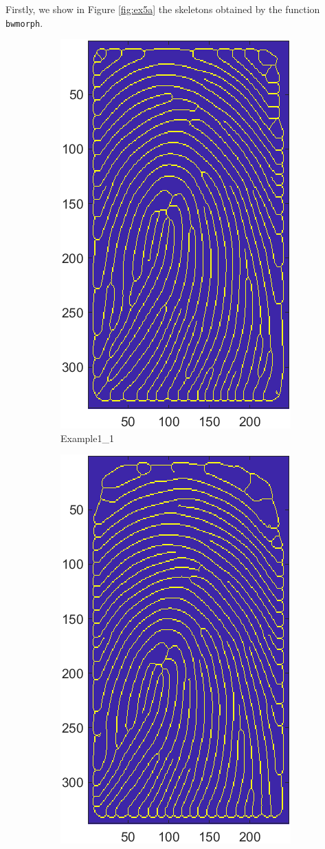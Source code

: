 \documentclass[a4paper]{article}
\def\inline{\lstinline[basicstyle=\ttfamily,keywordstyle={}]}
\begin{document}
Firstly, we show in Figure \ref{fig:ex5a} the skeletons obtained by the function \inline{bwmorph}.

\begin{figure}[H]
  \centering
       \begin{subfigure}[t]{0.45\textwidth}
         \centering
         \includegraphics[scale=0.6]{Figures/Skeleton1}
         \caption{Example1\_1}
     \end{subfigure}%
     \quad
     \begin{subfigure}[t]{0.45\textwidth}
         \centering
         \includegraphics[scale=0.6]{Figures/Skeleton2}

\end{subfigure}
\end{figure}
\end{document}

